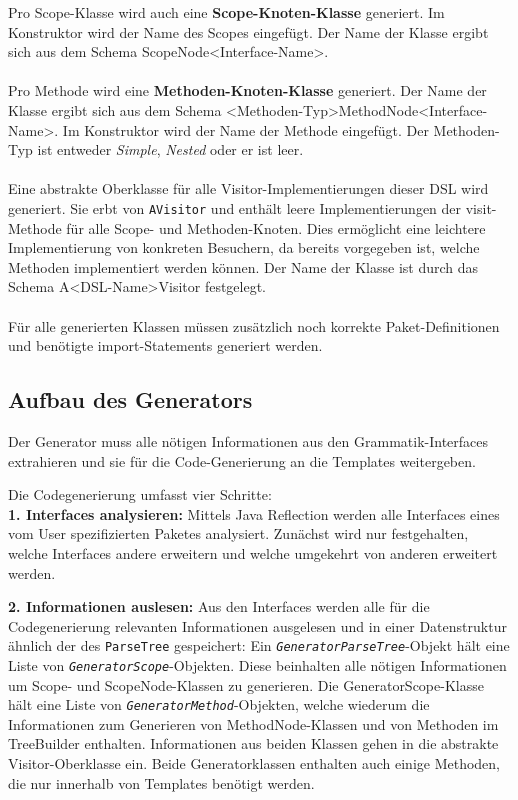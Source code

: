 \noindent
Pro Scope-Klasse wird auch eine \textbf{Scope-Knoten-Klasse} generiert. Im Konstruktor wird der Name des Scopes eingefügt. Der Name der Klasse ergibt sich aus dem Schema ScopeNode<Interface-Name>.
\\ \\
\noindent
Pro Methode wird eine \textbf{Methoden-Knoten-Klasse} generiert.
Der Name der Klasse ergibt sich aus dem Schema <Methoden-Typ>MethodNode<Interface-Name>. Im Konstruktor wird der Name der Methode eingefügt. Der Methoden-Typ ist entweder \emph{Simple}, \emph{Nested} oder er ist leer.
\\ \\
\noindent
Eine abstrakte Oberklasse für alle Visitor-Implementierungen dieser DSL wird generiert. Sie erbt von \texttt{AVisitor} und enthält leere Implementierungen der visit-Methode für alle Scope- und Methoden-Knoten. Dies ermöglicht eine leichtere Implementierung von konkreten Besuchern, da bereits vorgegeben ist, welche Methoden implementiert werden können. Der Name der Klasse ist durch das Schema A<DSL-Name>Visitor festgelegt.
\\ \\
Für alle generierten Klassen müssen zusätzlich noch korrekte Paket-Definitionen und benötigte import-Statements generiert werden.

\subsection{Aufbau des Generators}\label{ssct:5.2.2:generator}
Der Generator muss alle nötigen Informationen aus den Grammatik-Interfaces extrahieren und sie für die Code-Generierung an die Templates weitergeben.

Die Codegenerierung umfasst vier Schritte:\\

\textbf{1. Interfaces analysieren:} Mittels Java Reflection werden alle Interfaces eines vom User spezifizierten Paketes analysiert. Zunächst wird nur festgehalten, welche Interfaces andere erweitern und welche umgekehrt von anderen erweitert werden.

\textbf{2. Informationen auslesen:} Aus den Interfaces werden alle für die Codegenerierung relevanten Informationen ausgelesen und in einer Datenstruktur ähnlich der des \texttt{ParseTree} gespeichert: Ein \emph{\texttt{GeneratorParseTree}}-Objekt hält eine Liste von  \emph{\texttt{GeneratorScope}}-Objekten. Diese beinhalten alle nötigen Informationen um Scope- und ScopeNode-Klassen zu generieren. Die GeneratorScope-Klasse hält eine Liste von \emph{\texttt{GeneratorMethod}}-Objekten, welche wiederum die Informationen zum Generieren von MethodNode-Klassen und von Methoden im TreeBuilder enthalten. Informationen aus beiden Klassen gehen in die abstrakte Visitor-Oberklasse ein. Beide Generatorklassen enthalten auch einige Methoden, die nur innerhalb von Templates benötigt werden.

